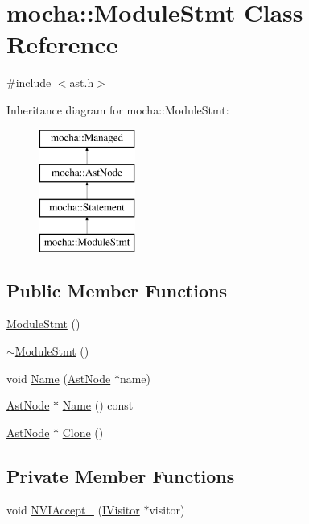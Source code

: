 \hypertarget{classmocha_1_1_module_stmt}{
\section{mocha::ModuleStmt Class Reference}
\label{classmocha_1_1_module_stmt}
}


{\ttfamily \#include $<$ast.h$>$}

Inheritance diagram for mocha::ModuleStmt:\begin{figure}[H]
\begin{center}
\leavevmode
\includegraphics[height=4.000000cm]{classmocha_1_1_module_stmt}
\end{center}
\end{figure}
\subsection*{Public Member Functions}
\begin{DoxyCompactItemize}
\item 
\hyperlink{classmocha_1_1_module_stmt_ae55e73b48a3d754f712aa8d7957b89dc}{ModuleStmt} ()
\item 
\hyperlink{classmocha_1_1_module_stmt_a3b3bb4ed2ef35914b35dd90c5da376c9}{$\sim$ModuleStmt} ()
\item 
void \hyperlink{classmocha_1_1_module_stmt_a3e1b68120a7c4d11957078dad8687d8f}{Name} (\hyperlink{classmocha_1_1_ast_node}{AstNode} $\ast$name)
\item 
\hyperlink{classmocha_1_1_ast_node}{AstNode} $\ast$ \hyperlink{classmocha_1_1_module_stmt_a266ecf6da3061057ad180111a53aa736}{Name} () const 
\item 
\hyperlink{classmocha_1_1_ast_node}{AstNode} $\ast$ \hyperlink{classmocha_1_1_module_stmt_a924627822a09527a0ba57aaed5e48afa}{Clone} ()
\end{DoxyCompactItemize}
\subsection*{Private Member Functions}
\begin{DoxyCompactItemize}
\item 
void \hyperlink{classmocha_1_1_module_stmt_a2028c16db13ad29aeab6f53b4de08014}{NVIAccept\_\-} (\hyperlink{classmocha_1_1_i_visitor}{IVisitor} $\ast$visitor)
\end{DoxyCompactItemize}
